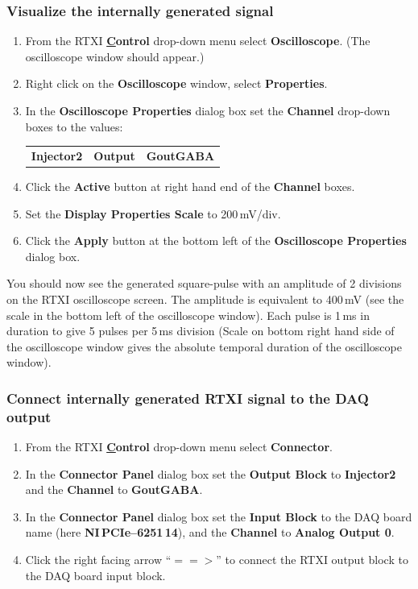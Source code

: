 \documentclass[12pt]{article}
\begin{document}
\subsubsection*{Visualize the internally generated signal}

\begin{enumerate}
	\item From the RTXI {\bf \underline Control} drop-down menu select {\bf Oscilloscope}. (The oscilloscope 
		window should appear.)
	\item Right click on the {\bf Oscilloscope} window, select {\bf Properties}.
	\item In the {\bf Oscilloscope Properties} dialog box set the {\bf Channel} drop-down boxes to the values:
		\begin{tabular}{ l c r }
			 {\bf Injector2} & {\bf Output} & {\bf GoutGABA}
		 \end{tabular}
	\item Click the {\bf Active} button at right hand end of the {\bf Channel} boxes.
 	\item Set the {\bf Display Properties Scale} to 200\,mV/div.
 \item Click the {\bf Apply} button at the bottom left of the {\bf Oscilloscope Properties} dialog box.

\end{enumerate}
You should now see the generated square-pulse  with an amplitude of 2 divisions on the RTXI oscilloscope screen. The amplitude is equivalent to 400\,mV (see the scale in the bottom left of the oscilloscope window). Each pulse is 1\,ms in duration to give 5 pulses per 5\,ms division (Scale on bottom right hand side of the oscilloscope window gives the absolute temporal duration of the oscilloscope window).

\subsubsection*{Connect internally generated RTXI signal to the DAQ output}

\begin{enumerate}
	\item From the RTXI {\bf \underline Control} drop-down menu select {\bf Connector}.
	\item In the {\bf Connector Panel} dialog box set the {\bf Output Block} to {\bf Injector2} and the {\bf 
		Channel} to {\bf GoutGABA}.
	\item In the {\bf Connector Panel} dialog box set the {\bf Input Block} to the DAQ board name (here 
		{\bf NI\,PCIe--6251\,14}), and the {\bf Channel} to {\bf Analog Output 0}.
	\item Click the right facing arrow ``$==>$'' to connect the RTXI output block to the DAQ board input 
		block.
\end{enumerate}
\end{document}
